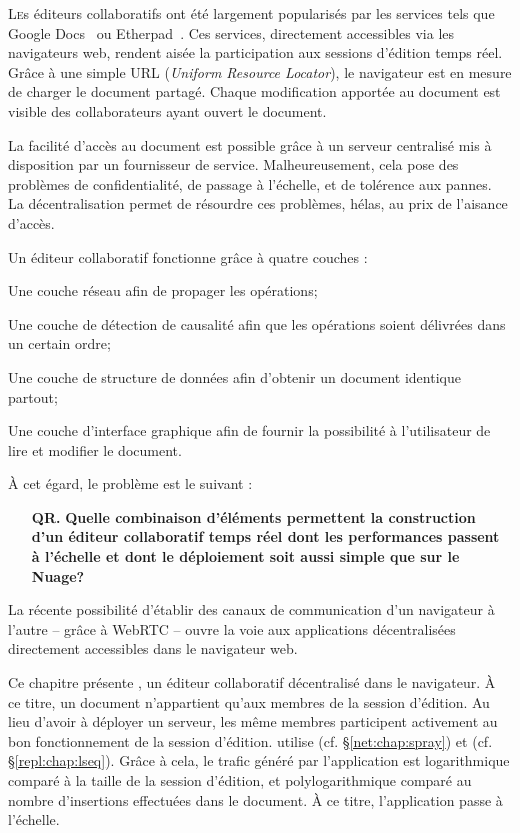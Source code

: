 
\lettrine{L}es éditeurs collaboratifs ont été largement popularisés par les
services tels que Google Docs~\cite{googledocs} ou Etherpad~\cite{etherpad}. Ces
services, directement accessibles via les navigateurs web, rendent aisée la
participation aux sessions d'édition temps réel. Grâce à une simple URL
(\emph{Uniform Resource Locator}), le navigateur est en mesure de charger le
document partagé. Chaque modification apportée au document est visible des
collaborateurs ayant ouvert le document.

La facilité d'accès au document est possible grâce à un serveur centralisé mis à
disposition par un fournisseur de service. Malheureusement, cela pose des
problèmes de confidentialité, de passage à l'échelle, et de tolérence aux
pannes. La décentralisation permet de résourdre ces problèmes, hélas, au prix de
l'aisance d'accès.

Un éditeur collaboratif fonctionne grâce à quatre couches :
\begin{inparaenum}[(i)]
\item Une couche réseau afin de propager les opérations;
\item Une couche de détection de causalité afin que les opérations soient
  délivrées dans un certain ordre;
\item Une couche de structure de données afin d'obtenir un document identique
  partout;
\item Une couche d'interface graphique afin de fournir la possibilité à
  l'utilisateur de lire et modifier le document.
\end{inparaenum}
À cet égard, le problème est le suivant :

\begin{itemize}
\item[\textbf{QR.}] \textbf{Quelle combinaison d'éléments permettent la
    construction d'un éditeur collaboratif temps réel dont les performances
    passent à l'échelle et dont le déploiement soit aussi simple que sur le
    Nuage?}
\end{itemize}

La récente possibilité d'établir des canaux de communication d'un navigateur à
l'autre -- grâce à WebRTC -- ouvre la voie aux applications décentralisées
directement accessibles dans le navigateur web.

Ce chapitre présente \CRATE, un éditeur collaboratif décentralisé dans le
navigateur. À ce titre, un document n'appartient qu'aux membres de la session
d'édition. Au lieu d'avoir à déployer un serveur, les même membres participent
activement au bon fonctionnement de la session d'édition. \CRATE utilise \SPRAY
(cf. §\ref{net:chap:spray}) et \LSEQ (cf. §\ref{repl:chap:lseq}). Grâce à cela,
le trafic généré par l'application est logarithmique comparé à la taille de la
session d'édition, et polylogarithmique comparé au nombre d'insertions
effectuées dans le document. À ce titre, l'application passe à l'échelle.

